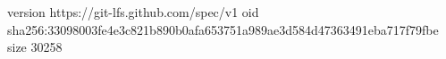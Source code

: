 version https://git-lfs.github.com/spec/v1
oid sha256:33098003fe4e3c821b890b0afa653751a989ae3d584d47363491eba717f79fbe
size 30258

